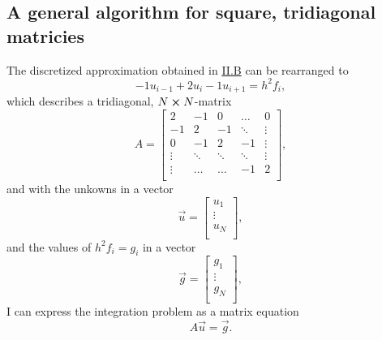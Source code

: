 \documentclass[english,notitlepage]{revtex4-1}  %
\begin{document}
\subsection{A general algorithm for square, tridiagonal matricies}\label{subsec:22}

The discretized approximation obtained in \hyperref[subsec:21]{II.B} can be rearranged to
$$
	-1u_{i-1}+2u_{i}-1u_{i+1}=h^{2}f_{i},
$$
which describes a tridiagonal, \(N\cross N\)-matrix
$$
	A =
	\begin{bmatrix}
	2 & -1 & 0 & \dots & 0 \\
	-1 & 2 & -1 & \ddots &\vdots \\
	0 & -1 & 2 & -1 & \vdots \\
	\vdots & \ddots & \ddots & \ddots & \vdots \\
	\vdots & \dots & \dots & -1 & 2 \\
	\end{bmatrix},
$$
and with the unkowns in a vector
$$
	\vec{u} =
	\begin{bmatrix}
		u_{1} \\
		\vdots \\
		u_{N} \\
	\end{bmatrix},
$$
and the values of \(h^{2}f_{i} = g_{i}\) in a vector
$$
	\vec{g} =
	\begin{bmatrix}
		g_{1} \\
		\vdots \\
		g_{N} \\
	\end{bmatrix},
$$
I can express the integration problem as a matrix equation
$$
	A\vec{u}=\vec{g}.
$$
\end{document}
